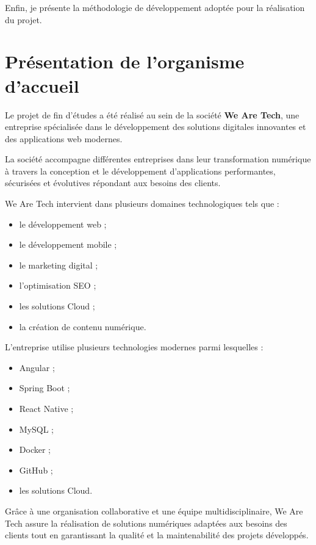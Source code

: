 \documentclass[a4paper,12pt]{report}
\begin{document}
Enfin, je présente la méthodologie de développement adoptée pour la réalisation du projet.


\section{Présentation de l'organisme d'accueil}

Le projet de fin d'études a été réalisé au sein de la société \textbf{We Are Tech}, une entreprise spécialisée dans le développement des solutions digitales innovantes et des applications web modernes.

La société accompagne différentes entreprises dans leur transformation numérique à travers la conception et le développement d'applications performantes, sécurisées et évolutives répondant aux besoins des clients.

We Are Tech intervient dans plusieurs domaines technologiques tels que :

\begin{itemize}
\item le développement web ;
\item le développement mobile ;
\item le marketing digital ;
\item l'optimisation SEO ;
\item les solutions Cloud ;
\item la création de contenu numérique.
\end{itemize}

L'entreprise utilise plusieurs technologies modernes parmi lesquelles :

\begin{itemize}
\item Angular ;
\item Spring Boot ;
\item React Native ;
\item MySQL ;
\item Docker ;
\item GitHub ;
\item les solutions Cloud.
\end{itemize}

Grâce à une organisation collaborative et une équipe multidisciplinaire, We Are Tech assure la réalisation de solutions numériques adaptées aux besoins des clients tout en garantissant la qualité et la maintenabilité des projets développés.
\end{document}
